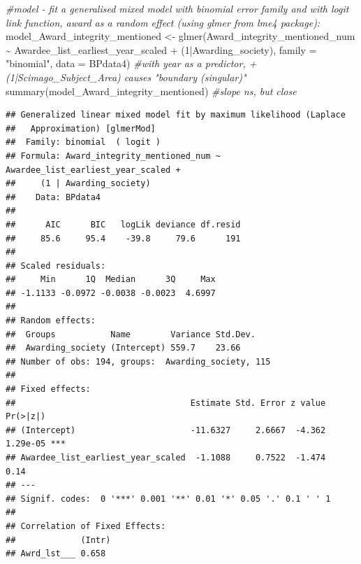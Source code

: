 \documentclass[
]{article}
\newenvironment{Shaded}{\begin{snugshade}}{\end{snugshade}}
\newcommand{\AttributeTok}[1]{\textcolor[rgb]{0.77,0.63,0.00}{#1}}
\newcommand{\CommentTok}[1]{\textcolor[rgb]{0.56,0.35,0.01}{\textit{#1}}}
\newcommand{\DecValTok}[1]{\textcolor[rgb]{0.00,0.00,0.81}{#1}}
\newcommand{\DocumentationTok}[1]{\textcolor[rgb]{0.56,0.35,0.01}{\textbf{\textit{#1}}}}
\newcommand{\FunctionTok}[1]{\textcolor[rgb]{0.00,0.00,0.00}{#1}}
\newcommand{\NormalTok}[1]{#1}
\newcommand{\OtherTok}[1]{\textcolor[rgb]{0.56,0.35,0.01}{#1}}
\newcommand{\SpecialCharTok}[1]{\textcolor[rgb]{0.00,0.00,0.00}{#1}}
\newcommand{\StringTok}[1]{\textcolor[rgb]{0.31,0.60,0.02}{#1}}
\begin{document}
\begin{Shaded}
\begin{Highlighting}[]
\CommentTok{\#model {-} fit a generalised mixed model with binomial error family and with logit link function, award as a random effect (using glmer from lme4 package):}
\NormalTok{model\_Award\_integrity\_mentioned }\OtherTok{\textless{}{-}} \FunctionTok{glmer}\NormalTok{(Award\_integrity\_mentioned\_num }\SpecialCharTok{\textasciitilde{}}\NormalTok{ Awardee\_list\_earliest\_year\_scaled }\SpecialCharTok{+}\NormalTok{  (}\DecValTok{1}\SpecialCharTok{|}\NormalTok{Awarding\_society), }\AttributeTok{family =} \StringTok{"binomial"}\NormalTok{, }\AttributeTok{data =}\NormalTok{ BPdata4) }\CommentTok{\#with year as a predictor, + (1|Scimago\_Subject\_Area) causes "boundary (singular)"}
\FunctionTok{summary}\NormalTok{(model\_Award\_integrity\_mentioned) }\CommentTok{\#slope ns, but close}
\end{Highlighting}
\end{Shaded}

\begin{verbatim}
## Generalized linear mixed model fit by maximum likelihood (Laplace
##   Approximation) [glmerMod]
##  Family: binomial  ( logit )
## Formula: Award_integrity_mentioned_num ~ Awardee_list_earliest_year_scaled +  
##     (1 | Awarding_society)
##    Data: BPdata4
## 
##      AIC      BIC   logLik deviance df.resid 
##     85.6     95.4    -39.8     79.6      191 
## 
## Scaled residuals: 
##     Min      1Q  Median      3Q     Max 
## -1.1133 -0.0972 -0.0038 -0.0023  4.6997 
## 
## Random effects:
##  Groups           Name        Variance Std.Dev.
##  Awarding_society (Intercept) 559.7    23.66   
## Number of obs: 194, groups:  Awarding_society, 115
## 
## Fixed effects:
##                                   Estimate Std. Error z value Pr(>|z|)    
## (Intercept)                       -11.6327     2.6667  -4.362 1.29e-05 ***
## Awardee_list_earliest_year_scaled  -1.1088     0.7522  -1.474     0.14    
## ---
## Signif. codes:  0 '***' 0.001 '**' 0.01 '*' 0.05 '.' 0.1 ' ' 1
## 
## Correlation of Fixed Effects:
##             (Intr)
## Awrd_lst___ 0.658
\end{verbatim}

\begin{Shaded}
\end{Shaded}
\end{document}
